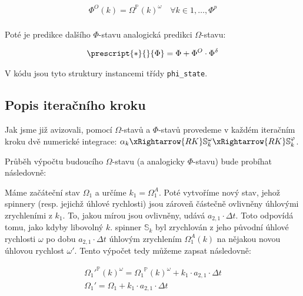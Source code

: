 \documentclass[12pt, a4paper,
 twoside,        %
 openright
]{report}
\begin{document}
\begin{equation}
    \label{eq:sim_equations_formalized6}
    \begin{gathered}
        \Phi^O(k) = {\Omega}^{\mathbb{P}}(k)^{\omega}
        \quad
        \forall k \in {1, \ldots, \Phi^{p}} \\
    \end{gathered}
\end{equation}

Poté je predikce dalšího $\Phi$-stavu analogická predikci $\Omega$-stavu:

\begin{equation}
    \label{eq:sim_equations_formalized7}
    \begin{gathered}
        \prescript{*}{}{\Phi} = \Phi + \Phi^O \cdot \Phi^{\delta}
    \end{gathered}
\end{equation}

V kódu jsou tyto struktury instancemi třídy \texttt{phi\_state}.

\subsection{Popis iteračního kroku}

Jak jsme již avizovali, pomocí $\Omega$-stavů a $\Phi$-stavů provedeme v každém iteračním kroku dvě numerické integrace: $\alpha_k \xRightarrow{RK} \mathbb{S}_k^{\omega}  \xRightarrow{RK} \mathbb{S}_k^{\varphi}$. 

Průběh výpočtu budoucího $\Omega$-stavu (a analogicky $\Phi$-stavu) bude probíhat následovně: 

Máme začáteční stav $\Omega_1$ a určíme $k_1 = \Omega_1^A$. 
Poté vytvoříme nový stav, jehož spinnery (resp. jejichž úhlové rychlosti) jsou zároveň částečně ovlivněny úhlovými zrychleními z $k_1$.
To, jakou mírou jsou ovlivněny, udává $a_{2, 1} \cdot \Delta t$.
Toto odpovídá tomu, jako kdyby libovolný $k$. spinner $\mathbb{S}_k$ byl zrychlován z jeho původní úhlové rychlosti $\omega$ po dobu $a_{2, 1} \cdot \Delta t$ úhlovým zrychlením $\Omega_1^A(k)$ na nějakou novou úhlovou rychlost $\omega'$.
Tento výpočet tedy můžeme zapsat následovně:

\begin{equation}
    \label{eq:sim_equations_formalized8}
    \begin{gathered}
        {\Omega_1'}^{\mathbb{P}} (k) ^{\omega} = {\Omega_1}^{\mathbb{P}} (k) ^{\omega} + k_1 \cdot a_{2, 1} \cdot \Delta t \\
        {\Omega_1'} = {\Omega_1} + k_1 \cdot a_{2, 1} \cdot \Delta t
    \end{gathered}
\end{equation}
\end{document}
